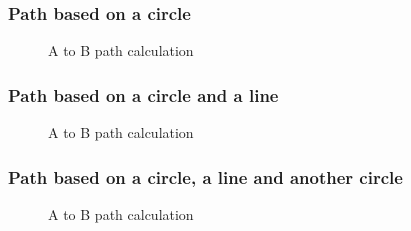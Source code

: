 \subsubsection{Path based on a circle}
\begin{figure}

\caption{A to B path calculation}
\label{fig:AtoBcircle}
\end{figure}


\subsubsection{Path based on a circle and a line}
\begin{figure}

\caption{A to B path calculation}
\label{fig:AtoBcircle}
\end{figure}


\subsubsection{Path based on a circle, a line and another circle}
\begin{figure}

\caption{A to B path calculation}
\label{fig:AtoBcircle}
\end{figure}